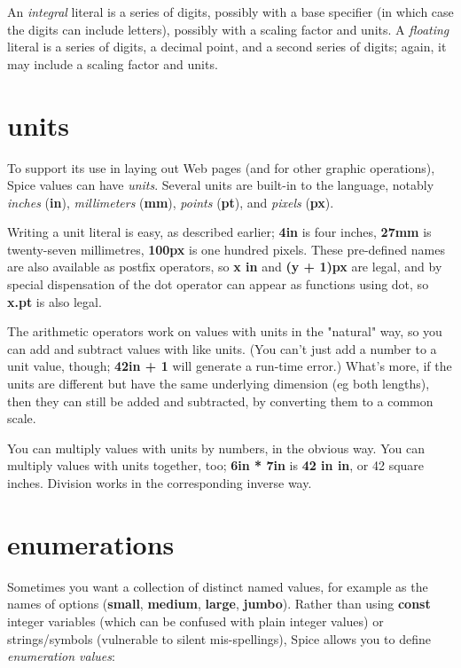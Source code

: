 \documentclass{report}
\begin{document}
An {\em integral} literal is a series of digits, possibly with a base specifier
(in which case the digits can include letters), possibly with a scaling factor
and units. A {\em floating} literal is a series of digits, a decimal point, and a
second series of digits; again, it may include a scaling factor and units.\chapter{units}


To support its use in laying out Web pages (and for other graphic operations),
Spice values can have {\em units}. Several units are built-in to the language,
notably {\em inches} ({\bf in}), {\em millimeters} ({\bf mm}), {\em points} ({\bf pt}), and {\em pixels}
({\bf px}).

Writing a unit literal is easy, as described earlier; {\bf 4in} is four inches,
{\bf 27mm} is twenty-seven millimetres, {\bf 100px} is one hundred pixels. These
pre-defined names are also available as postfix operators, so {\bf x in} and
{\bf (y + 1)px} are legal, and by special dispensation of the dot operator can
appear as functions using dot, so {\bf x.pt} is also legal.

The arithmetic operators work on values with units in the "natural" way,
so you can add and subtract values with like units. (You can't just add a
number to a unit value, though; {\bf 42in + 1} will generate a run-time error.)
What's more, if the units are different but have the same underlying
dimension (eg both lengths), then they can still be added and subtracted, by
converting them to a common scale.

You can multiply values with units by numbers, in the obvious way. You can
multiply values with units together, too; {\bf 6in * 7in} is {\bf 42 in in}, or
42 square inches. Division works in the corresponding inverse way.\chapter{enumerations}


Sometimes you want a collection of distinct named values, for example as
the names of options ({\bf small}, {\bf medium}, {\bf large}, {\bf jumbo}). Rather than using
{\bf const} integer variables (which can be confused with plain integer values) or
strings/symbols (vulnerable to silent mis-spellings), Spice allows you to
define {\em enumeration values}:
\end{document}
